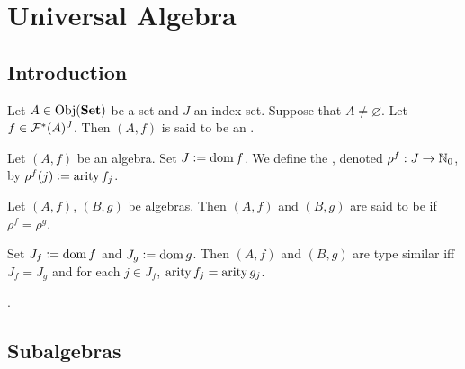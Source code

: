 \documentclass{book}
\begin{document}
	
	
	
	
	
	
	
	
	
	
	
	
	
	
	
	
	
	
	
	\newpage
	\chapter{Universal Algebra}
	
	\section{Introduction}
	
	\begin{defn}
		Let $A \in \operatorname{Obj}(\operatorname*{\text{\textbf{Set}}})$ be a set and $J$ an index set. Suppose that $A \neq \varnothing$. Let $f \in \mathcal{F}^*(A)^J$. Then $(A, f)$ is said to be an .
	\end{defn}

	\begin{defn}
		Let $(A, f)$ be an algebra. Set $J \vcentcolon= \operatorname{dom} f$. We define the , denoted $\rho^f: J \rightarrow \mathbb{N}_0$, by $\rho^f(j) \vcentcolon= \operatorname*{\text{arity}} f_j$.
	\end{defn}

	\begin{defn}
		Let $(A, f)$, $(B, g)$ be algebras. Then $(A, f)$ and $(B, g)$ are said to be  if $\rho^f = \rho^g$.
	\end{defn}

	\begin{note}
		Set $J_f \vcentcolon= \operatorname{dom} f$ and $J_g \vcentcolon= \operatorname{dom} g$. Then $(A, f)$ and $(B, g)$ are type similar iff $J_f = J_g$ and for each $j \in J_f$, $\operatorname*{\text{arity}} f_j = \operatorname*{\text{arity}} g_j$.
	\end{note}

	.











	\newpage
	\section{Subalgebras}
	
\end{document}
